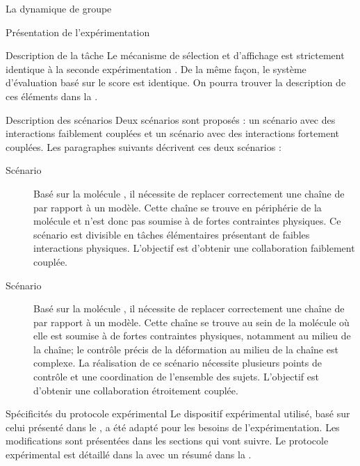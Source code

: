 \documentclass[myfrancais,ngerman,english,frenchb]{mythesis}
\begin{document}
\begin{mychapter}{La dynamique de groupe}
\begin{mysection}{Présentation de l'expérimentation}
\begin{mysubsection}{Description de la tâche}
				Le mécanisme de sélection et d'affichage est strictement identique à la seconde expérimentation .
				De la même façon, le système d'évaluation basé sur le score  est identique.
				On pourra trouver la description de ces éléments dans la .
				\begin{mysubsubsection}{Description des scénarios}
					Deux scénarios sont proposés : un scénario avec des interactions faiblement couplées et un scénario avec des interactions fortement couplées.
					Les paragraphes suivants décrivent ces deux scénarios :
					\begin{description}
						\item[Scénario~]
							Basé sur la molécule \myPrion, il nécessite de replacer correctement une chaîne de ~ par rapport à un modèle.
							Cette chaîne se trouve en périphérie de la molécule et n'est donc pas soumise à de fortes contraintes physiques.
							Ce scénario est divisible en tâches élémentaires présentant de faibles interactions physiques.
							L'objectif est d'obtenir une collaboration faiblement couplée.
						\item[Scénario~]
							Basé sur la molécule \myUbiquitin, il nécessite de replacer correctement une chaîne de ~ par rapport à un modèle.
							Cette chaîne se trouve au sein de la molécule où elle est soumise à de fortes contraintes physiques, notamment au milieu de la chaîne; le contrôle précis de la déformation au milieu de la chaîne est complexe.
							La réalisation de ce scénario nécessite plusieurs points de contrôle et une coordination de l'ensemble des sujets.
							L'objectif est d'obtenir une collaboration étroitement couplée.
					\end{description}
				\end{mysubsubsection}
			\end{mysubsection}
			\begin{mysubsection}{Spécificités du protocole expérimental}
				Le dispositif expérimental utilisé, basé sur celui présenté dans le , a été adapté pour les besoins de l'expérimentation.
				Les modifications sont présentées dans les sections qui vont suivre.
				Le protocole expérimental est détaillé dans la  avec un résumé dans la .

\end{mysubsection}
\end{mysection}
\end{mychapter}
\end{document}
